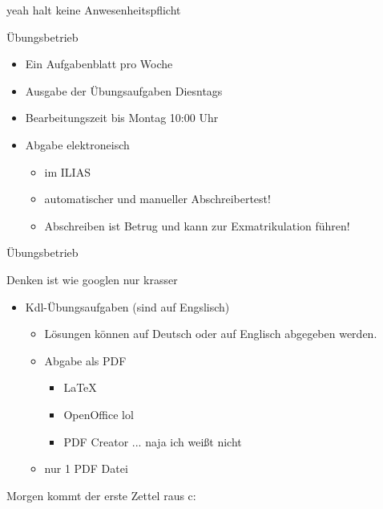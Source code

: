 \documentclass{gadsescript}
\begin{document}
yeah halt keine Anwesenheitspflicht

Übungsbetrieb
\begin{itemize}
	\item Ein Aufgabenblatt pro Woche
	\item Ausgabe der Übungsaufgaben Diesntags
	\item Bearbeitungszeit bis {\color{red} Montag 10:00 Uhr}
	\item Abgabe elektroneisch
		\begin{itemize}
			\item im ILIAS
			\item automatischer und manueller Abschreibertest!
			\item Abschreiben ist Betrug und kann zur Exmatrikulation führen!
		\end{itemize}
\end{itemize}

Übungsbetrieb\\
\indent\quad
\begin{minipage}{0.5\textwidth}
	Denken ist wie googlen nur krasser
\end{minipage}

\begin{itemize}
	\item Kdl-Übungsaufgaben (sind auf Engslisch)
		\begin{itemize}
			\item Lösungen können auf Deutsch oder auf Englisch abgegeben werden.
			\item Abgabe als PDF
				\begin{itemize}
					\item \LaTeX
					\item OpenOffice lol
					\item PDF Creator ... naja ich weißt nicht
				\end{itemize}
			\item nur 1 PDF Datei
		\end{itemize}
\end{itemize}

Morgen kommt der erste Zettel raus c:
\end{document}
